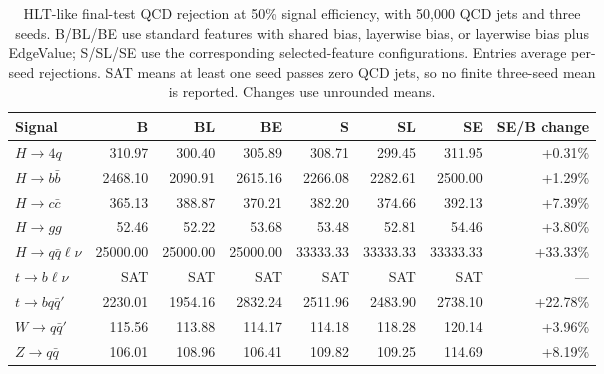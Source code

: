 \begin{table}[htbp]
\centering
\footnotesize
\setlength{\tabcolsep}{2.5pt}
\begin{tabularx}{\linewidth}{@{}Xrrrrrrr@{}}
\toprule
Signal & B & BL & BE & S & SL & SE & SE/B change \\
\midrule
$H\to4q$ & 310.97 & 300.40 & 305.89 & 308.71 & 299.45 & 311.95 & +0.31\% \\ %
$H\to b\bar b$ & 2468.10 & 2090.91 & 2615.16 & 2266.08 & 2282.61 & 2500.00 & +1.29\% \\ %
$H\to c\bar c$ & 365.13 & 388.87 & 370.21 & 382.20 & 374.66 & 392.13 & +7.39\% \\ %
$H\to gg$ & 52.46 & 52.22 & 53.68 & 53.48 & 52.81 & 54.46 & +3.80\% \\ %
$H\to q\bar q\ell\nu$ & 25000.00 & 25000.00 & 25000.00 & 33333.33 & 33333.33 & 33333.33 & +33.33\% \\ %
$t\to b\ell\nu$ & SAT & SAT & SAT & SAT & SAT & SAT & --- \\ %
$t\to bq\bar q'$ & 2230.01 & 1954.16 & 2832.24 & 2511.96 & 2483.90 & 2738.10 & +22.78\% \\ %
$W\to q\bar q'$ & 115.56 & 113.88 & 114.17 & 114.18 & 118.28 & 120.14 & +3.96\% \\ %
$Z\to q\bar q$ & 106.01 & 108.96 & 106.41 & 109.82 & 109.25 & 114.69 & +8.19\% \\ %
\bottomrule
\end{tabularx}
\caption{HLT-like final-test QCD rejection at 50\% signal efficiency,
with 50,000 QCD jets and three seeds. B/BL/BE use standard features with
shared bias, layerwise bias, or layerwise bias plus EdgeValue; S/SL/SE
use the corresponding selected-feature configurations. Entries average
per-seed rejections. SAT means at least one seed passes zero QCD jets,
so no finite three-seed mean is reported. Changes use unrounded means.}
\label{tab:hlt-rejection-50}
\end{table}
